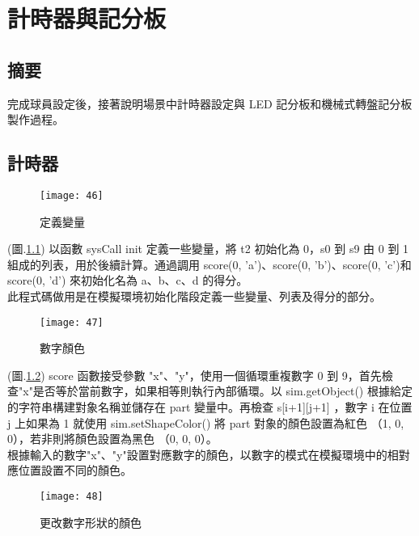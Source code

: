 \chapter{計時器與記分板}
\renewcommand{\baselinestretch}{10.0} %
\setcounter{page}{8}  %
\fontsize{14pt}{2.5pt}\sectionef
\section{摘要}
  完成球員設定後，接著說明場景中計時器設定與 LED 記分板和機械式轉盤記分板製作過程。\\
\section{計時器}
\begin{figure}[hbt!]
\begin{center}
\texttt{[image: 46]}
\caption{\Large 定義變量}\label{fig.46}
\end{center}
\end{figure}
(圖.\ref{fig.46}) 以函數 sysCall init 定義一些變量，將 t2 初始化為 0，s0 到 s9 由 0 到 1 組成的列表，用於後續計算。通過調用 score(0, 'a')、score(0, 'b')、score(0, 'c')和 score(0, 'd') 來初始化名為 a、b、c、d 的得分。\\
  此程式碼做用是在模擬環境初始化階段定義一些變量、列表及得分的部分。\\
\newpage
\begin{figure}[hbt!]
\begin{center}
\texttt{[image: 47]}
\caption{\Large 數字顏色}\label{fig.47}
\end{center}
\end{figure}
(圖.\ref{fig.47}) score 函數接受參數 "x"、"y"，使用一個循環重複數字 0 到 9，首先檢查"x"是否等於當前數字，如果相等則執行內部循環。以 sim.getObject() 根據給定的字符串構建對象名稱並儲存在 part 變量中。再檢查 s[i+1][j+1] ，數字 i 在位置 j 上如果為 1 就使用 sim.setShapeColor() 將 part 對象的顏色設置為紅色 （{1, 0, 0}），若非則將顏色設置為黑色 （{0, 0, 0}）。\\
  根據輸入的數字"x"、"y"設置對應數字的顏色，以數字的模式在模擬環境中的相對應位置設置不同的顏色。\\
\newpage
\begin{figure}[hbt!]
\begin{center}
\texttt{[image: 48]}
\caption{\Large 更改數字形狀的顏色}\label{fig.48}
\end{center}
\end{figure}


